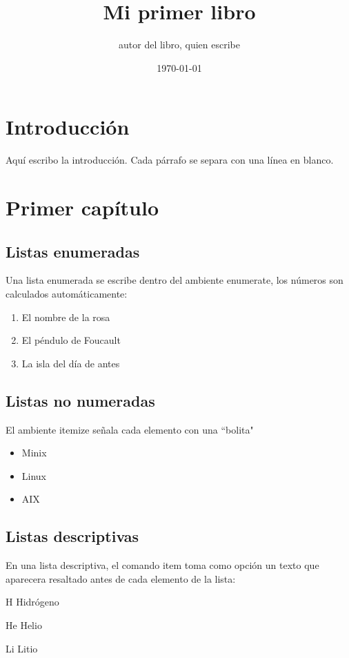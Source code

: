 \documentclass[12pt]{book} %
\title{Mi primer libro}
\author{autor del libro, quien escribe}
\date{\today}%
\begin{document}
 
\maketitle
 
\frontmatter
 
\tableofcontents
 
\chapter{Introducci\'on}
 
Aqu\'i escribo la introducci\'on. Cada p\'arrafo se separa con una l\'inea en blanco.
 
\mainmatter
 
\chapter{Primer cap\'itulo}
 \section{Listas enumeradas}
 Una lista enumerada se escribe dentro del ambiente enumerate, los 
 n\'umeros son calculados autom\'aticamente:
\begin{enumerate}
 \item El nombre de la rosa
 \item El p\'endulo de Foucault
 \item La isla del d\'ia de antes
\end{enumerate}

\section{Listas no numeradas}
El ambiente itemize se\~nala cada elemento con una ``bolita"
\begin{itemize}
\item Minix
\item Linux
\item AIX
\end{itemize}

\section{Listas descriptivas}
En una lista descriptiva, el comando item toma como opci\'on un 
texto que aparecera resaltado antes de cada elemento de la lista:
\begin{description}
\item{H} Hidr\'ogeno
\item{He} Helio
\item{Li} Litio
\end{description}
\end{document}
